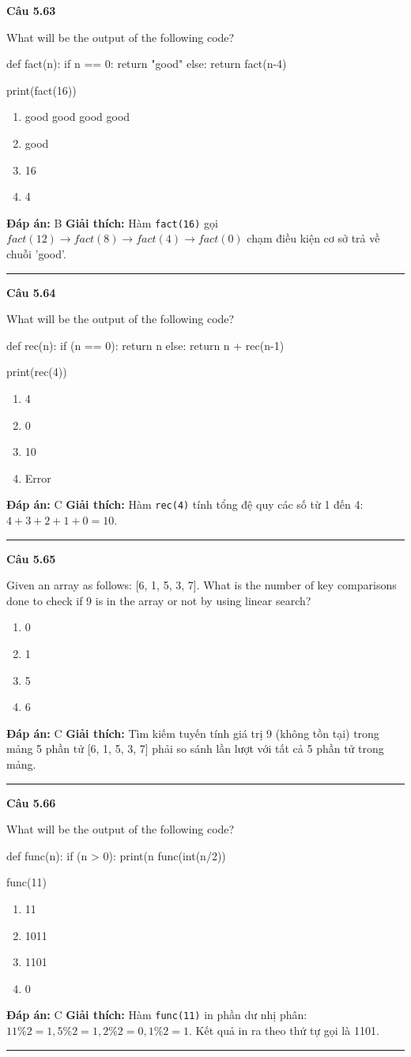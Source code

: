 \documentclass[11pt,a4paper]{article}
\newenvironment{question}[1]{%
  \par\vspace{1em}\noindent\textbf{\large Câu #1}\par\vspace{0.4em}
}{%
  \par\vspace{1em}\hrule\vspace{0.6em}
}
\newenvironment{choices}{%
  \begin{enumerate}[label=\textbf{\Alph*.},leftmargin=2.2em,itemsep=2pt,topsep=3pt]
}{%
  \end{enumerate}
}
\newcommand{\choice}{\item}
\newenvironment{codebox}{%
  \begin{tcolorbox}[colback=gray!8!white,colframe=gray!50!black,arc=1.5mm,boxrule=0.6pt,left=3mm,right=3mm,top=2.5mm,bottom=2.5mm]
  \ttfamily\small
}{%
  \end{tcolorbox}
}
\begin{document}
\begin{question}{5.63}
What will be the output of the following code?
\begin{codebox}
def fact(n):
    if n == 0:
        return "good"
    else:
        return fact(n-4)

print(fact(16))
\end{codebox}
\begin{choices}
\choice good good good good
\choice good
\choice 16
\choice 4
\end{choices}
\textbf{Đáp án:} B
\textbf{Giải thích:} Hàm \texttt{fact(16)} gọi $fact(12) \to fact(8) \to fact(4) \to fact(0)$ chạm điều kiện cơ sở trả về chuỗi 'good'.
\end{question}

\begin{question}{5.64}
What will be the output of the following code?
\begin{codebox}
def rec(n):
    if (n == 0):
        return n
    else:
        return n + rec(n-1)

print(rec(4))
\end{codebox}
\begin{choices}
\choice 4
\choice 0
\choice 10
\choice Error
\end{choices}
\textbf{Đáp án:} C
\textbf{Giải thích:} Hàm \texttt{rec(4)} tính tổng đệ quy các số từ 1 đến 4: $4 + 3 + 2 + 1 + 0 = 10$.
\end{question}

\begin{question}{5.65}
Given an array as follows: [6, 1, 5, 3, 7]. What is the number of key comparisons done to check if 9 is in the array or not by using linear search?
\begin{choices}
\choice 0
\choice 1
\choice 5
\choice 6
\end{choices}
\textbf{Đáp án:} C
\textbf{Giải thích:} Tìm kiếm tuyến tính giá trị 9 (không tồn tại) trong mảng 5 phần tử [6, 1, 5, 3, 7] phải so sánh lần lượt với tất cả 5 phần tử trong mảng.
\end{question}

\begin{question}{5.66}
What will be the output of the following code?
\begin{codebox}
def func(n):
    if (n > 0):
        print(n%
        func(int(n/2))

func(11)
\end{codebox}
\begin{choices}
\choice 11
\choice 1011
\choice 1101
\choice 0
\end{choices}
\textbf{Đáp án:} C
\textbf{Giải thích:} Hàm \texttt{func(11)} in phần dư nhị phân: $11\%2=1, 5\%2=1, 2\%2=0, 1\%2=1$. Kết quả in ra theo thứ tự gọi là 1101.
\end{question}
\end{document}
